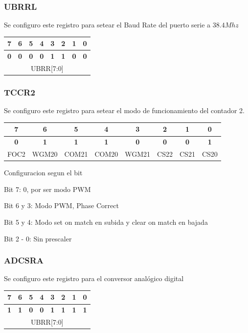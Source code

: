 \documentclass[10pt,spanish,a4paper,openany,notitlepage]{article}
\begin{document}
\subsubsection{UBRRL}
Se configuro este registro para setear el Baud Rate del puerto serie a $38.4Mhz$
\begin{center}
\begin{tabular}{|c|c|c|c|c|c|c|c|}\hline
7&6&5&4&3&2&1&0\\\hline
\textbf{0}&\textbf{0}&\textbf{0}&\textbf{0}&\textbf{1}&\textbf{1}&\textbf{0}&\textbf{0}\\\hline
\multicolumn{8}{|c|}{UBRR[7:0]}\\\hline
\end{tabular}
\end{center}

\subsubsection{TCCR2}\label{TCCR2}
Se configuro este registro para setear el modo de funcionamiento del contador 2. 
\begin{center}
\begin{tabular}{|c|c|c|c|c|c|c|c|}\hline
7&6&5&4&3&2&1&0\\\hline
\textbf{0}&\textbf{1}&\textbf{1}&\textbf{1}&\textbf{0}&\textbf{0}&\textbf{0}&\textbf{1}\\\hline
FOC2&WGM20&COM21&COM20&WGM21&CS22&CS21&CS20\\\hline
\end{tabular}
\end{center}

\begin{description}
\item{Configuracion segun el bit}
\item{Bit 7}: 0, por ser modo PWM
\item{Bit 6 y 3}: Modo PWM, Phase Correct
\item{Bit 5 y 4}: Modo set on match en subida y clear on match en bajada
\item{Bit 2 - 0}: Sin prescaler
\end{description}

\subsubsection{ADCSRA}
Se configuro este registro para el conversor analógico digital
\begin{center}
\begin{tabular}{|c|c|c|c|c|c|c|c|}\hline
7&6&5&4&3&2&1&0\\\hline
\textbf{1}&\textbf{1}&\textbf{0}&\textbf{0}&\textbf{1}&\textbf{1}&\textbf{1}&\textbf{1}\\\hline
\multicolumn{8}{|c|}{UBRR[7:0]}\\\hline
\end{tabular}
\end{center}
\end{document}

